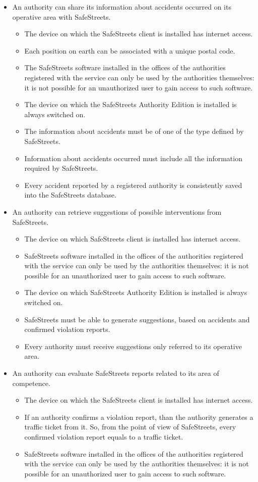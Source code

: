 \documentclass{article}
\newcommand\goal[1]{\item[{[G#1]}] }
\newcommand\requirement[1]{\item[{[R#1]}] }
\newcommand\assumption[1]{\item[{[A#1]}] }
\begin{document}
\begin{itemize}
\begin{itemize}
				\end{itemize}					
				\goal{3}An authority can share its information about accidents occurred on its operative area with SafeStreets.
				\begin{itemize}
					\assumption{1} The device on which the SafeStreets client is installed has internet access.
					\assumption{7} Each position on earth can be associated with a unique postal code.
					\assumption{12} The SafeStreets software installed in the offices of the authorities registered with the service can only be used by the authorities themselves: it is not possible for an unauthorized user to gain access to such software.
					\assumption{13} The device on which the SafeStreets Authority Edition is installed is always switched on.
				   \requirement{14} The information about accidents must be of one of the type defined by SafeStreets.
				   \requirement{15} Information about accidents occurred must include all the information required by SafeStreets.
				   \requirement{16} Every accident reported by a registered authority is consistently saved into the SafeStreets database.
				\end{itemize}
				\goal{4}An authority can retrieve suggestions of possible interventions from SafeStreets.
				\begin{itemize}
					\assumption{1} The device on which SafeStreets client is installed has internet access.
					\assumption{12} SafeStreets software installed in the offices of the authorities registered with the service can only be used by the authorities themselves: it is not possible for an unauthorized user to gain access to such software.
					\assumption{13} The device on which SafeStreets Authority Edition is installed is always switched on.
					\requirement{18} SafeStreets must be able to generate suggestions, based on accidents and confirmed violation reports.
					\requirement{19} Every authority must receive suggestions only referred to its operative area.
				\end{itemize}
				\goal{5}An authority can evaluate SafeStreets reports related to its area of competence.
				\begin{itemize}
					\assumption{1} The device on which the SafeStreets client is installed has internet access.
					\assumption{11} If an authority confirms a violation report, than the authority generates a traffic ticket from it. So, from the point of view of SafeStreets, every confirmed violation report equals to a traffic ticket.
					\assumption{12} SafeStreets software installed in the offices of the authorities registered with the service can only be used by the authorities themselves: it is not possible for an unauthorized user to gain access to such software.

\end{itemize}
\end{itemize}
\end{document}
